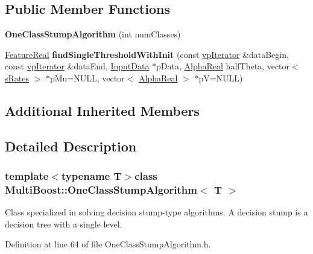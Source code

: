 \subsection*{Public Member Functions}
\begin{DoxyCompactItemize}
\item 
\hypertarget{classMultiBoost_1_1OneClassStumpAlgorithm_ad7cbdbcc4a6576177ec18cf2d1e05a22}{{\bfseries One\-Class\-Stump\-Algorithm} (int num\-Classes)}\label{classMultiBoost_1_1OneClassStumpAlgorithm_ad7cbdbcc4a6576177ec18cf2d1e05a22}

\item 
\hypertarget{classMultiBoost_1_1OneClassStumpAlgorithm_a0c59e11de4a72bdf391a18d097bbb1af}{\hyperlink{Defaults_8h_a3a11cfe6a5d469d921716ca6291e934f}{Feature\-Real} {\bfseries find\-Single\-Threshold\-With\-Init} (const \hyperlink{classMultiBoost_1_1OneClassStumpAlgorithm_a5ad69d710488cdd1aa350baf36c13384}{vp\-Iterator} \&data\-Begin, const \hyperlink{classMultiBoost_1_1OneClassStumpAlgorithm_a5ad69d710488cdd1aa350baf36c13384}{vp\-Iterator} \&data\-End, \hyperlink{classMultiBoost_1_1InputData}{Input\-Data} $\ast$p\-Data, \hyperlink{Defaults_8h_a80184c4fd10ab70a1a17c5f97dcd1563}{Alpha\-Real} half\-Theta, vector$<$ \hyperlink{structMultiBoost_1_1sRates}{s\-Rates} $>$ $\ast$p\-Mu=N\-U\-L\-L, vector$<$ \hyperlink{Defaults_8h_a80184c4fd10ab70a1a17c5f97dcd1563}{Alpha\-Real} $>$ $\ast$p\-V=N\-U\-L\-L)}\label{classMultiBoost_1_1OneClassStumpAlgorithm_a0c59e11de4a72bdf391a18d097bbb1af}

\end{DoxyCompactItemize}
\subsection*{Additional Inherited Members}


\subsection{Detailed Description}
\subsubsection*{template$<$typename T$>$class Multi\-Boost\-::\-One\-Class\-Stump\-Algorithm$<$ T $>$}

Class specialized in solving decision stump-\/type algorithms. A decision stump is a decision tree with a single level. 

Definition at line 64 of file One\-Class\-Stump\-Algorithm.\-h.



